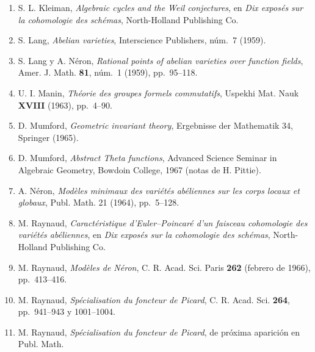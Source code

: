 \begin{enumerate}

\item[{[14]}] S. L. Kleiman, \emph{Algebraic cycles and the Weil
  conjectures}, en \emph{Dix exposés sur la cohomologie des schémas},
  North-Holland Publishing Co.
\item[{[15]}] S. Lang, \emph{Abelian varieties}, Interscience Publishers,
  núm.~7 (1959).
\item[{[16]}] S. Lang y A. Néron, \emph{Rational points of abelian
  varieties over function fields}, Amer. J. Math. \textbf{81}, núm.~1
  (1959), pp.~95--118.
\item[{[16bis]}] U. I. Manin, \emph{Théorie des groupes formels
  commutatifs}, Uspekhi Mat. Nauk \textbf{XVIII} (1963), pp.~4--90.
\item[{[17]}] D. Mumford, \emph{Geometric invariant theory}, Ergebnisse
  der Mathematik 34, Springer (1965).
\item[{[18]}] D. Mumford, \emph{Abstract Theta functions}, Advanced
  Science Seminar in Algebraic Geometry, Bowdoin College, 1967 (notas de
  H. Pittie).
\item[{[19]}] A. Néron, \emph{Modèles minimaux des variétés abéliennes
  sur les corps locaux et globaux}, Publ. Math. 21 (1964), pp.~5--128.
\item[{[20]}] M. Raynaud, \emph{Caractéristique d'Euler--Poincaré d'un
  faisceau  cohomologie des variétés abéliennes}, en
  \emph{Dix exposés sur la cohomologie des schémas}, North-Holland
  Publishing Co.
\item[{[21]}] M. Raynaud, \emph{Modèles de Néron}, C. R. Acad. Sci.
  Paris \textbf{262} (febrero de 1966), pp.~413--416.
\item[{[22]}] M. Raynaud, \emph{Spécialisation du foncteur de Picard},
  C. R. Acad. Sci. \textbf{264}, pp.~941--943 y 1001--1004.
\item[{[22bis]}] M. Raynaud, \emph{Spécialisation du foncteur de
  Picard}, de próxima aparición en Publ. Math.



\end{enumerate}
